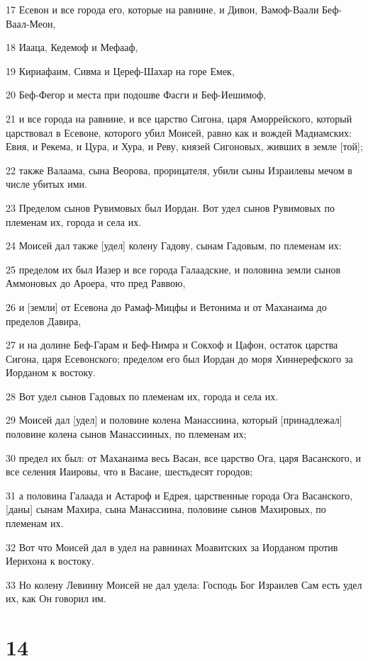 \par 17 Есевон и все города его, которые на равнине, и Дивон, Вамоф-Ваали Беф-Ваал-Меон,
\par 18 Иааца, Кедемоф и Мефааф,
\par 19 Кириафаим, Сивма и Цереф-Шахар на горе Емек,
\par 20 Беф-Фегор и места при подошве Фасги и Беф-Иешимоф,
\par 21 и все города на равнине, и все царство Сигона, царя Аморрейского, который царствовал в Есевоне, которого убил Моисей, равно как и вождей Мадиамских: Евия, и Рекема, и Цура, и Хура, и Реву, князей Сигоновых, живших в земле [той];
\par 22 также Валаама, сына Веорова, прорицателя, убили сыны Израилевы мечом в числе убитых ими.
\par 23 Пределом сынов Рувимовых был Иордан. Вот удел сынов Рувимовых по племенам их, города и села их.
\par 24 Моисей дал также [удел] колену Гадову, сынам Гадовым, по племенам их:
\par 25 пределом их был Иазер и все города Галаадские, и половина земли сынов Аммоновых до Ароера, что пред Раввою,
\par 26 и [земли] от Есевона до Рамаф-Мицфы и Ветонима и от Маханаима до пределов Давира,
\par 27 и на долине Беф-Гарам и Беф-Нимра и Сокхоф и Цафон, остаток царства Сигона, царя Есевонского; пределом его был Иордан до моря Хиннерефского за Иорданом к востоку.
\par 28 Вот удел сынов Гадовых по племенам их, города и села их.
\par 29 Моисей дал [удел] и половине колена Манассиина, который [принадлежал] половине колена сынов Манассииных, по племенам их;
\par 30 предел их был: от Маханаима весь Васан, все царство Ога, царя Васанского, и все селения Иаировы, что в Васане, шестьдесят городов;
\par 31 а половина Галаада и Астароф и Едрея, царственные города Ога Васанского, [даны] сынам Махира, сына Манассиина, половине сынов Махировых, по племенам их.
\par 32 Вот что Моисей дал в удел на равнинах Моавитских за Иорданом против Иерихона к востоку.
\par 33 Но колену Левиину Моисей не дал удела: Господь Бог Израилев Сам есть удел их, как Он говорил им.

\chapter{14}

